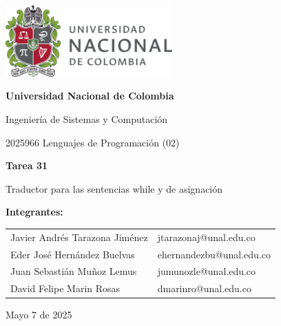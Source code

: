 \documentclass{article}
\begin{document}
\begin{titlepage}
    \centering
    \includegraphics[width=0.48\textwidth]{logo_universidad.png}
    \par\vspace{2cm}

    {\Large \textbf{Universidad Nacional de Colombia} \par}
    \vspace{0.5cm}
    {\large Ingeniería de Sistemas y Computación \par}
    {\large 2025966 Lenguajes de Programación (02)\par}
    \vspace{3cm}

    {\large \textbf{Tarea 31} \par}
    {\large Traductor para las sentencias while y de asignación\par}
    \vspace{3cm}

    {\large \textbf{Integrantes:} \par}
    \vspace{0.5cm}
    \begin{tabular}{ll}
    Javier Andrés Tarazona Jiménez & jtarazonaj@unal.edu.co   \\
    Eder  José Hernández Buelvas   & ehernandezbu@unal.edu.co \\
    Juan Sebastián Muñoz Lemus     & jumunozle@unal.edu.co   \\
    David Felipe Marin Rosas       & dmarinro@unal.edu.co   \\
    \end{tabular}
    \par\vspace{3cm}

    {\large Mayo 7 de 2025 \par}
\end{titlepage}

\tableofcontents %

\newpage %
\end{document}
